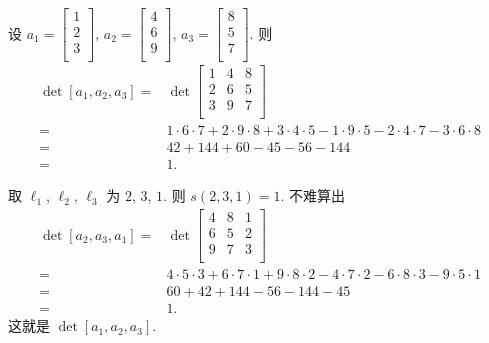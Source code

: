 \documentclass[../libro.tex]{subfiles}
\begin{document}
\begin{example}
    设
    \(a_1 =
        \begin{bmatrix}
            1 \\ 2 \\ 3 \\
    \end{bmatrix}\),
    \(a_2 =
        \begin{bmatrix}
            4 \\ 6 \\ 9 \\
    \end{bmatrix}\),
    \(a_3 =
        \begin{bmatrix}
            8 \\ 5 \\ 7 \\
    \end{bmatrix}\).
    则
    \begin{align*}
        \det {[a_1, a_2, a_3]}
        = {} &
        \det {
            \begin{bmatrix}
                1 & 4 & 8 \\
                2 & 6 & 5 \\
                3 & 9 & 7 \\
        \end{bmatrix}}
        \\
        = {} &
        1 \cdot 6 \cdot 7 + 2 \cdot 9 \cdot 8 + 3 \cdot 4 \cdot 5
        - 1 \cdot 9 \cdot 5 - 2 \cdot 4 \cdot 7 - 3 \cdot 6 \cdot 8
        \\
        = {} &
        42 + 144 + 60 - 45 - 56 - 144
        \\
        = {} & 1.
    \end{align*}

    取 \(\ell_1\), \(\ell_2\), \(\ell_3\) 为 \(2\), \(3\), \(1\).
    则 \(s(2, 3, 1) = 1\).
    不难算出
    \begin{align*}
        \det {[a_2, a_3, a_1]}
        = {} &
        \det {
            \begin{bmatrix}
                4 & 8 & 1 \\
                6 & 5 & 2 \\
                9 & 7 & 3 \\
        \end{bmatrix}}
        \\
        = {} &
        4 \cdot 5 \cdot 3 + 6 \cdot 7 \cdot 1 + 9 \cdot 8 \cdot 2
        - 4 \cdot 7 \cdot 2 - 6 \cdot 8 \cdot 3 - 9 \cdot 5 \cdot 1
        \\
        = {} &
        60 + 42 + 144 - 56 - 144 - 45
        \\
        = {} & 1.
    \end{align*}
    这就是 \(\det {[a_1, a_2, a_3]}\).


\end{example}
\end{document}
